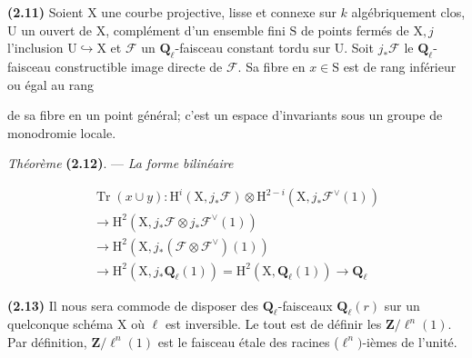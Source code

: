 \documentclass[10pt,leqno]{article}
\begin{document}
\noindent \textbf{(2.11)} Soient \(\mathrm{X}\) une courbe projective, lisse et connexe sur \(k\) algébriquement clos, \(\mathrm{U}\) un ouvert de \(\mathrm{X}\), complément d’un ensemble fini \(\mathrm{S}\) de points fermés de \(\mathrm{X}, j\) l’inclusion \(\mathrm{U}\hookrightarrow \mathrm{X}\) et \(\mathcal{F} \) un \(\mathbf{Q}_{\ell }\)-faisceau constant tordu sur \(\mathrm{U}\). Soit \(j_{*}\mathcal{F} \) le \(\mathbf{Q}_{\ell }\)-faisceau constructible image directe de \(\mathcal{F} \). Sa fibre en \(x\in \mathrm{S}\) est de rang inférieur ou égal au rang\par

\clearpage

\label{physical-12}\par\smallskip

\noindent de sa fibre en un point général; c’est un espace d’invariants sous un groupe de monodromie locale.\par

\noindent \emph{Théorème} \textbf{(2.12)}. — {\itshape La forme bilinéaire}\par

\begin{equation*}\begin{gathered}\operatorname{Tr}(x\cup y) : \mathrm{H}^{i}(\mathrm{X},j_{*}\mathcal{F} )\otimes \mathrm{H}^{2- i}(\mathrm{X},j_{*}\mathcal{F} ^{\vee }(1)) \\ \longrightarrow  \mathrm{H}^{2}(\mathrm{X},j_{*}\mathcal{F} \otimes j_{*}\mathcal{F} ^{\vee }(1)) \\ \longrightarrow  \mathrm{H}^{2}(\mathrm{X},j_{*}(\mathcal{F} \otimes \mathcal{F} ^{\vee })(1)) \\ \longrightarrow  \mathrm{H}^{2}(\mathrm{X},j_{*}\mathbf{Q}_{\ell }(1)) = \mathrm{H}^{2}(\mathrm{X},\mathbf{Q}_{\ell }(1)) \longrightarrow  \mathbf{Q}_{\ell }\end{gathered}\end{equation*}

\par

\noindent \textbf{(2.13)} Il nous sera commode de disposer des \(\mathbf{Q}_{\ell }\)-faisceaux \(\mathbf{Q}_{\ell }(r)\) sur un quelconque schéma \(\mathrm{X}\) où \(\ell \) est inversible. Le tout est de définir les \(\mathbf{Z}/\ell ^{n}(1)\). Par définition, \(\mathbf{Z}/\ell ^{n}(1)\) est le faisceau étale des racines (\(\ell ^{n})\)-ièmes de l’unité.\par
\end{document}
